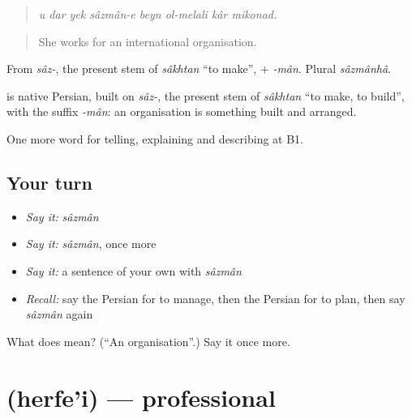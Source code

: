 \begin{quote}
\emph{u dar yek sâzmân-e beyn ol-melali kâr mikonad.}
\end{quote}

\begin{quote}
She works for an international organisation.
\end{quote}

From \emph{sâz-}, the present stem of \emph{sâkhtan} \textquotedblleft{}to make\textquotedblright{}, + \emph{-mân}. Plural \emph{sâzmânhâ}.

\begin{cousinweb}
\textbf{} is native Persian, built on \emph{sâz-}, the present stem of \emph{sâkhtan} \textquotedblleft{}to make, to build\textquotedblright{}, with the suffix \emph{-mân}: an organisation is something built and arranged.
\end{cousinweb}

\begin{grammarlens}[title={What you've built}]
One more word for telling, explaining and describing at B1.
\end{grammarlens}

\subsection*{Your turn}
\begin{itemize}
\raggedright
  \item \emph{Say it:} \emph{sâzmân}
  \item \emph{Say it:} \emph{sâzmân}, once more
  \item \emph{Say it:} a sentence of your own with \emph{sâzmân}
  \item \emph{Recall:} say the Persian for to manage, then the Persian for to plan, then say \emph{sâzmân} again
\end{itemize}

\begin{tcolorbox}[breakable,colback=teal!4,colframe=teal!35!black,title={Before you move on}]
What does  mean? (\textquotedblleft{}An organisation\textquotedblright{}.) Say it once more.
\end{tcolorbox}
\section[\texorpdfstring{\fa{حرفه} \fa{ای} (herfe'i)}{حرفه ای (herfe'i)}]{  (herfe'i) — professional}

\label{lesson:FA-C382-herfei}



